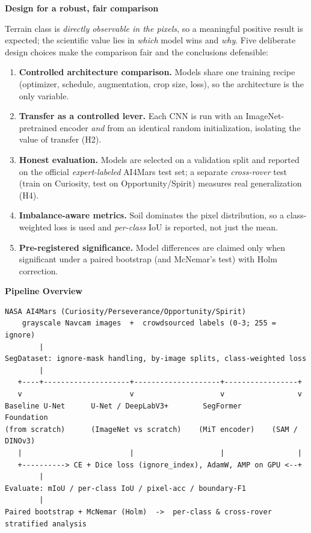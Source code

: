 \documentclass[11pt]{article}
\newcommand{\hdr}[1]{\medskip\noindent\textbf{#1}\par\nopagebreak}
\begin{document}
\hdr{Design for a robust, fair comparison}
Terrain class is \emph{directly observable in the pixels}, so a meaningful positive result is
expected; the scientific value lies in \emph{which} model wins and \emph{why}. Five deliberate design
choices make the comparison fair and the conclusions defensible:
\begin{enumerate}
  \item \textbf{Controlled architecture comparison.} Models share one training recipe (optimizer,
  schedule, augmentation, crop size, loss), so the architecture is the only variable.
  \item \textbf{Transfer as a controlled lever.} Each CNN is run with an ImageNet-pretrained encoder
  \emph{and} from an identical random initialization, isolating the value of transfer (H2).
  \item \textbf{Honest evaluation.} Models are selected on a validation split and reported on the
  official \emph{expert-labeled} AI4Mars test set; a separate \emph{cross-rover} test (train on
  Curiosity, test on Opportunity/Spirit) measures real generalization (H4).
  \item \textbf{Imbalance-aware metrics.} Soil dominates the pixel distribution, so a class-weighted
  loss is used and \emph{per-class} IoU is reported, not just the mean.
  \item \textbf{Pre-registered significance.} Model differences are claimed only when significant
  under a paired bootstrap (and McNemar's test) with Holm correction.
\end{enumerate}

\hdr{Pipeline Overview}
\begin{verbatim}
NASA AI4Mars (Curiosity/Perseverance/Opportunity/Spirit)
    grayscale Navcam images  +  crowdsourced labels (0-3; 255 = ignore)
        |
SegDataset: ignore-mask handling, by-image splits, class-weighted loss
        |
   +----+--------------------+--------------------+-----------------+
   v                         v                    v                 v
Baseline U-Net      U-Net / DeepLabV3+        SegFormer        Foundation
(from scratch)      (ImageNet vs scratch)    (MiT encoder)    (SAM / DINOv3)
   |                         |                    |                 |
   +----------> CE + Dice loss (ignore_index), AdamW, AMP on GPU <--+
        |
Evaluate: mIoU / per-class IoU / pixel-acc / boundary-F1
        |
Paired bootstrap + McNemar (Holm)  ->  per-class & cross-rover stratified analysis
\end{verbatim}
\end{document}
